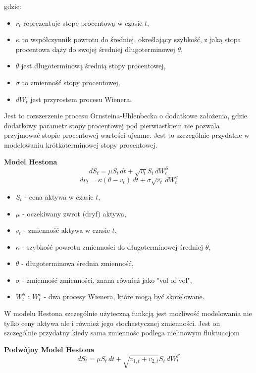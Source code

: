 gdzie:
\begin{itemize}
  \item \( r_t \) reprezentuje stopę procentową w czasie \( t \),
  \item \( \kappa \) to współczynnik powrotu do średniej, określający szybkość, z jaką stopa procentowa dąży do swojej średniej długoterminowej \( \theta \),
  \item \( \theta \) jest długoterminową średnią stopy procentowej,
  \item \( \sigma \) to zmienność stopy procentowej,
  \item \( dW_t \) jest przyrostem procesu Wienera.
\end{itemize}
Jest to rozszerzenie procesu Ornsteina-Uhlenbecka o dodatkowe założenia, gdzie dodatkowy parametr stopy procentowej pod pierwiastkiem nie pozwala przyjmować stopie procentowej wartości ujemne. Jest to szczególnie przydatne w modelowaniu krótkoterminowej stopy procentowej. 
    \item \textbf{Model Hestona}
    \begin{equation}
dS_t = \mu S_t \, dt + \sqrt{v_t} S_t \, dW_t^S
\end{equation}
\begin{equation}
dv_t = \kappa (\theta - v_t) \, dt + \sigma \sqrt{v_t} \, dW_t^v
\end{equation}
\begin{itemize}
  \item \( S_t \) - cena aktywa w czasie \( t \),
  \item \( \mu \) - oczekiwany zwrot (dryf) aktywa,
  \item \( v_t \) - zmienność aktywa w czasie \( t \),
  \item \( \kappa \) - szybkość powrotu zmienności do długoterminowej średniej \( \theta \),
  \item \( \theta \) - długoterminowa średnia zmienność,
  \item \( \sigma \) - zmienność zmienności, znana również jako "vol of vol",
  \item \( W_t^S \) i \( W_t^v \) - dwa procesy Wienera, które mogą być skorelowane.
\end{itemize}
W modelu Hestona szczególnie użyteczną funkcją jest możliwość modelowania nie tylko ceny aktywa ale i również jego stochastycznej zmienności. Jest on szczególnie przydatny kiedy sama zmiennośc podlega nielinowym fluktuacjom
 \item \textbf{Podwójny Model Hestona}
\begin{equation}
dS_t = \mu S_t \, dt + \sqrt{v_{1,t} + v_{2,t}} S_t \, dW_t^S
\end{equation}
